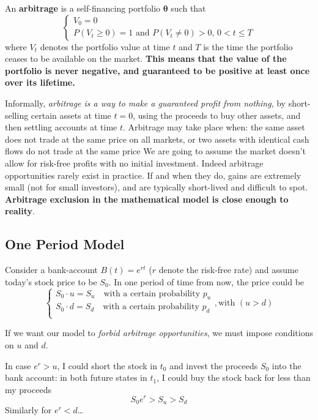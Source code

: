 \documentclass[12pt,a4paper]{book}
\begin{document}
An \textbf{arbitrage} is a self-financing portfolio $\mathbf{\theta}$ such that
\begin{equation}
\begin{cases}
V_0 = 0 \\
P(V_{t}\geq 0)=1\text{ and }P(V_{t}\neq 0)>0,\,0<t\leq T
\end{cases}
\end{equation}
where $V_t$ denotes the portfolio value at time $t$ and $T$ is the time the portfolio ceases to be available on the market. 
\textbf{This means that the value of the portfolio is never negative, and guaranteed to be positive at least once over its lifetime.}

Informally, \emph{arbitrage is a way to make a guaranteed profit from nothing}, by short-selling certain assets at time $t = 0$, using the proceeds to buy other assets, and then settling accounts at time $t$. 
Arbitrage may take place when: the same asset does not trade at the same price on all markets, or two assets with identical cash flows do not trade at the same price
We are going to assume the market doesn't allow for risk-free profits with no initial investment.
Indeed arbitrage opportunities rarely exist in practice. If and when they do, gains are extremely small (not for small investors), and are typically short-lived and difficult to spot. 
\textbf{Arbitrage exclusion in the mathematical model is close enough to reality}.

\subsection{One Period Model}
Consider a bank-account $B(t)=e^{rt}$ ($r$ denote the risk-free rate) and assume today's stock price to be $S_0$. In one period of time from now, the price could be 
\begin{equation*}
\begin{cases}
S_0\cdot u = S_u \quad\text{with a certain probability $p_u$} \\
S_0\cdot d = S_d \quad\text{with a certain probability $p_d$}\\ 
\end{cases}, \text{with }(u > d)
\end{equation*}

If we want our model to \emph{forbid arbitrage opportunities}, we must impose conditions on $u$ and $d$. 
		
In case $e^r > u$, I could short the stock in $t_0$ and invest the proceeds $S_0$ into the bank account: in both future states in $t_1$, I could buy the stock back for less than my proceeds 
\begin{equation*}
S_0e^r > S_u > S_d
\end{equation*} Similarly for $e^r < d$\ldots
\end{document}
